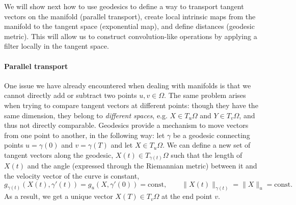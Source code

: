 We will show next how to use geodesics to define a way to transport tangent vectors on the manifold (parallel transport), create local intrinsic maps from the manifold to the tangent space (exponential map), and define distances (geodesic metric). This will allow us to construct convolution-like operations by applying a filter locally in the tangent space. %



\paragraph{Parallel transport}
One issue we have already encountered when dealing with manifolds is that we cannot directly add or subtract two points $u,v \in \Omega$. 
%
The same problem arises when trying to compare tangent vectors at different points: though they have the same dimension, they belong to {\em different spaces}, e.g. $X\in T_u\Omega$ and $Y\in T_v\Omega$, and thus not directly comparable. 
%
Geodesics provide a mechanism to move vectors from one point to another, in the following way: let $\gamma$ be a geodesic connecting points $u=\gamma(0)$ and $v=\gamma(T)$ and let $X \in T_u\Omega$. We can define a new set of tangent vectors along the geodesic, $X(t) \in T_{\gamma(t)}\Omega$ such that the length of $X(t)$ and the angle (expressed through the Riemannian metric) between it and the velocity vector of the curve is constant,
$$
g_{\gamma(t)}(X(t),\gamma'(t) ) = g_{u}(X,\gamma'(0)) = \mathrm{const}, \quad\quad \|X(t)\|_{\gamma(t)} = \|X\|_u = \mathrm{const}.
$$
As a result, we get a unique vector $X(T) \in T_{v}\Omega$ at the end point $v$. %


